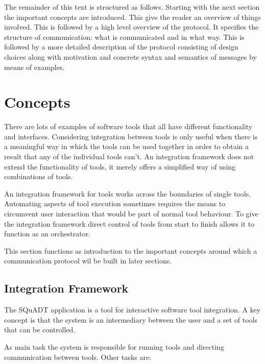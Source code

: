 \documentclass{article}
\newcommand{\squadt}{SQuADT\xspace}
\begin{document}
  The remainder of this text is structured as follows. Starting with the next
  section the important concepts are introduced. This give the reader an
  overview of things involved.  This is followed by a high level overview of
  the protocol. It specifies the structure of communication: what is
  communicated and in what way. This is followed by a more detailed description
  of the protocol consisting of design choices along with motivation and
  concrete syntax and semantics of messages by means of examples.


 \section{Concepts}

   There are lots of examples of software tools that all have different
   functionality and interfaces. Considering integration between tools is only
   useful when there is a meaningful way in which the tools can be used
   together in order to obtain a result that any of the individual tools can't.
   An integration framework does not extend the functionality of tools, it
   merely offers a simplified way of using combinations of tools.
 
   An integration framework for tools works across the boundaries of single
   tools. Automating aspects of tool execution sometimes requires the means to
   circumvent user interaction that would be part of normal tool behaviour. To
   give the integration framework direct control of tools from start to finish
   allows it to function as an orchestrator. 

   This section functions as introduction to the important concepts around
   which a communication protocol wil be built in later sections.

  \subsection{Integration Framework}

   The \squadt application is a tool for interactive software tool integration.
   A key concept is that the system is an intermediary between the user and a
   set of tools that can be controlled.

   As main task the system is responsible for running tools and directing
   communication between tools. Other tasks are:
   
\end{document}
